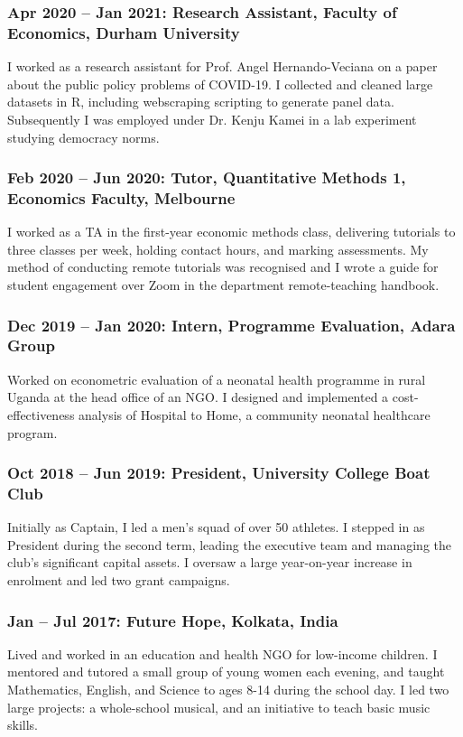 \documentclass[a4]{article}
\begin{document}
\subsubsection*{Apr 2020 -- Jan 2021: Research Assistant, Faculty of Economics, Durham University}
I worked as a research assistant for Prof. Angel Hernando-Veciana on a paper about the public policy problems of COVID-19. I collected and cleaned large datasets in R, including webscraping scripting to generate panel data. Subsequently I was employed under Dr. Kenju Kamei in a lab experiment studying democracy norms.

\subsubsection*{Feb 2020 -- Jun 2020: Tutor, Quantitative Methods 1, Economics Faculty, Melbourne}
I worked as a TA in the first-year economic methods class, delivering tutorials to three classes per week, holding contact hours, and marking assessments. My method of conducting remote tutorials was recognised and I wrote a guide for student engagement over Zoom in the department remote-teaching handbook.

\subsubsection*{Dec 2019 -- Jan 2020: Intern, Programme Evaluation, Adara Group}
Worked on econometric evaluation of a neonatal health programme in rural Uganda at the head office of an NGO. I designed and implemented a cost-effectiveness analysis of Hospital to Home, a community neonatal healthcare program.

\subsubsection*{Oct 2018 -- Jun 2019: President, University College Boat Club}
Initially as Captain, I led a men’s squad of over 50 athletes. I stepped in as President during the second term, leading the executive team and managing the club’s significant capital assets. I oversaw a large year-on-year increase in enrolment and led two grant campaigns.

\subsubsection*{Jan -- Jul 2017: Future Hope, Kolkata, India}
Lived and worked in an education and health NGO for low-income children. I mentored and tutored a small group of young women each evening, and taught Mathematics, English, and Science to ages 8-14 during the school day. I led two large projects: a whole-school musical, and an initiative to teach basic music skills. 
\end{document}
